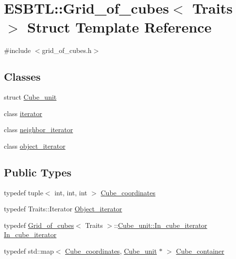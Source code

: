 \hypertarget{structESBTL_1_1Grid__of__cubes}{}\section{E\+S\+B\+TL\+:\+:Grid\+\_\+of\+\_\+cubes$<$ Traits $>$ Struct Template Reference}
\label{structESBTL_1_1Grid__of__cubes}


{\ttfamily \#include $<$grid\+\_\+of\+\_\+cubes.\+h$>$}

\subsection*{Classes}
\begin{DoxyCompactItemize}
\item 
struct \hyperlink{structESBTL_1_1Grid__of__cubes_1_1Cube__unit}{Cube\+\_\+unit}
\item 
class \hyperlink{classESBTL_1_1Grid__of__cubes_1_1iterator}{iterator}
\item 
class \hyperlink{classESBTL_1_1Grid__of__cubes_1_1neighbor__iterator}{neighbor\+\_\+iterator}
\item 
class \hyperlink{classESBTL_1_1Grid__of__cubes_1_1object__iterator}{object\+\_\+iterator}
\end{DoxyCompactItemize}
\subsection*{Public Types}
\begin{DoxyCompactItemize}
\item 
typedef tuple$<$ int, int, int $>$ \hyperlink{structESBTL_1_1Grid__of__cubes_ad55c84346bab961e08d95e494551d07d}{Cube\+\_\+coordinates}
\item 
typedef Traits\+::\+Iterator \hyperlink{structESBTL_1_1Grid__of__cubes_ae77665f05d6c7ae05c3d2d764df99193}{Object\+\_\+iterator}
\item 
typedef \hyperlink{structESBTL_1_1Grid__of__cubes}{Grid\+\_\+of\+\_\+cubes}$<$ Traits $>$\+::\hyperlink{structESBTL_1_1Grid__of__cubes_1_1Cube__unit_a9a5e21b8376bdeb122987e83f89b3c06}{Cube\+\_\+unit\+::\+In\+\_\+cube\+\_\+iterator} \hyperlink{structESBTL_1_1Grid__of__cubes_a1586dac85e561a73b591da3cf07a47b1}{In\+\_\+cube\+\_\+iterator}
\item 
typedef std\+::map$<$ \hyperlink{structESBTL_1_1Grid__of__cubes_ad55c84346bab961e08d95e494551d07d}{Cube\+\_\+coordinates}, \hyperlink{structESBTL_1_1Grid__of__cubes_1_1Cube__unit}{Cube\+\_\+unit} $\ast$ $>$ \hyperlink{structESBTL_1_1Grid__of__cubes_aaa528fd99e0133f58e9f5bb09925a036}{Cube\+\_\+container}
\end{DoxyCompactItemize}
